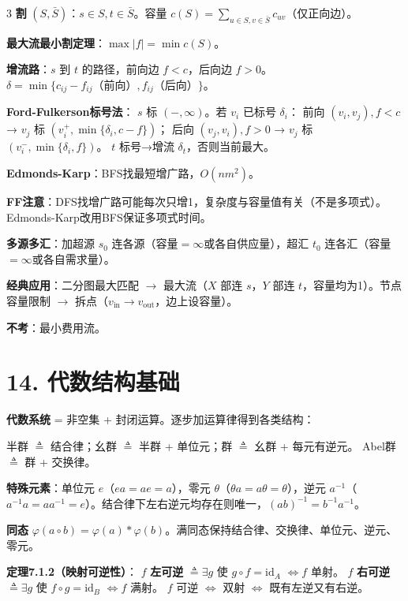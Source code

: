 \documentclass[10pt,a4paper,landscape]{ctexart}
\begin{document}
\begin{multicols}{3}
\textbf{割} $(S,\bar{S})$：$s\in S,t\in\bar{S}$。容量 $c(S)=\sum_{u\in S,v\in\bar{S}}c_{uv}$（仅正向边）。

\textbf{最大流最小割定理}：$\max|f|=\min c(S)$。

\textbf{增流路}：$s$ 到 $t$ 的路径，前向边 $f<c$，后向边 $f>0$。
$\delta=\min\{c_{ij}-f_{ij}\text{（前向）}, f_{ij}\text{（后向）}\}$。

\textbf{Ford-Fulkerson标号法}：
$s$ 标 $(-,\infty)$。若 $v_i$ 已标号 $\delta_i$：
前向 $(v_i,v_j),f<c$ → $v_j$ 标 $(v_i^+,\min\{\delta_i,c-f\})$；
后向 $(v_j,v_i),f>0$ → $v_j$ 标 $(v_i^-,\min\{\delta_i,f\})$。
$t$ 标号→增流 $\delta_t$，否则当前最大。

\textbf{Edmonds-Karp}：BFS找最短增广路，$O(nm^2)$。

\textbf{FF注意}：DFS找增广路可能每次只增1，复杂度与容量值有关（不是多项式）。Edmonds-Karp改用BFS保证多项式时间。

\textbf{多源多汇}：加超源 $s_0$ 连各源（容量$=\infty$或各自供应量），超汇 $t_0$ 连各汇（容量$=\infty$或各自需求量）。

\textbf{经典应用}：二分图最大匹配 $\to$ 最大流（$X$ 部连 $s$，$Y$ 部连 $t$，容量均为1）。节点容量限制 $\to$ 拆点（$v_{\text{in}}\to v_{\text{out}}$，边上设容量）。

\textbf{不考}：最小费用流。

\section*{14. 代数结构基础}

\textbf{代数系统} = 非空集 + 封闭运算。逐步加运算律得到各类结构：

半群 $\triangleq$ 结合律；幺群 $\triangleq$ 半群 + 单位元；群 $\triangleq$ 幺群 + 每元有逆元。
Abel群 $\triangleq$ 群 + 交换律。

\textbf{特殊元素}：单位元 $e$（$ea=ae=a$），零元 $\theta$（$\theta a=a\theta=\theta$），逆元 $a^{-1}$（$a^{-1}a=aa^{-1}=e$）。结合律下左右逆元均存在则唯一，$(ab)^{-1}=b^{-1}a^{-1}$。

\textbf{同态} $\varphi(a\circ b)=\varphi(a)*\varphi(b)$。满同态保持结合律、交换律、单位元、逆元、零元。

\textbf{定理7.1.2（映射可逆性）}：
$f$ \textbf{左可逆} $\triangleq\exists g$ 使 $g\circ f=\mathrm{id}_A$ $\iff f$ 单射。
$f$ \textbf{右可逆} $\triangleq\exists g$ 使 $f\circ g=\mathrm{id}_B$ $\iff f$ 满射。
$f$ 可逆 $\iff$ 双射 $\iff$ 既有左逆又有右逆。


\end{multicols}
\end{document}
